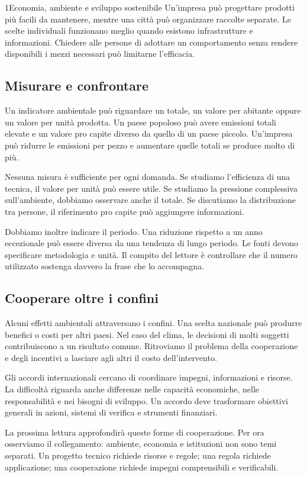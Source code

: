 \begin{lettura}{1}{Economia, ambiente e sviluppo sostenibile}
Un'impresa può progettare prodotti più facili da mantenere, mentre una città può organizzare raccolte separate. Le scelte individuali funzionano meglio quando esistono infrastrutture e informazioni. Chiedere alle persone di adottare un comportamento senza rendere disponibili i mezzi necessari può limitarne l'efficacia.

\subsection*{Misurare e confrontare}
Un indicatore ambientale può riguardare un totale, un valore per abitante oppure un valore per unità prodotta. Un paese popoloso può avere emissioni totali elevate e un valore pro capite diverso da quello di un paese piccolo. Un'impresa può ridurre le emissioni per pezzo e aumentare quelle totali se produce molto di più.

Nessuna misura è sufficiente per ogni domanda. Se studiamo l'efficienza di una tecnica, il valore per unità può essere utile. Se studiamo la pressione complessiva sull'ambiente, dobbiamo osservare anche il totale. Se discutiamo la distribuzione tra persone, il riferimento pro capite può aggiungere informazioni.

Dobbiamo inoltre indicare il periodo. Una riduzione rispetto a un anno eccezionale può essere diversa da una tendenza di lungo periodo. Le fonti devono specificare metodologia e unità. Il compito del lettore è controllare che il numero utilizzato sostenga davvero la frase che lo accompagna.

\subsection*{Cooperare oltre i confini}
Alcuni effetti ambientali attraversano i confini. Una scelta nazionale può produrre benefici o costi per altri paesi. Nel caso del clima, le decisioni di molti soggetti contribuiscono a un risultato comune. Ritroviamo il problema della cooperazione e degli incentivi a lasciare agli altri il costo dell'intervento.

Gli accordi internazionali cercano di coordinare impegni, informazioni e risorse. La difficoltà riguarda anche differenze nelle capacità economiche, nelle responsabilità e nei bisogni di sviluppo. Un accordo deve trasformare obiettivi generali in azioni, sistemi di verifica e strumenti finanziari.

La prossima lettura approfondirà queste forme di cooperazione. Per ora osserviamo il collegamento: ambiente, economia e istituzioni non sono temi separati. Un progetto tecnico richiede risorse e regole; una regola richiede applicazione; una cooperazione richiede impegni comprensibili e verificabili.


\end{lettura}
